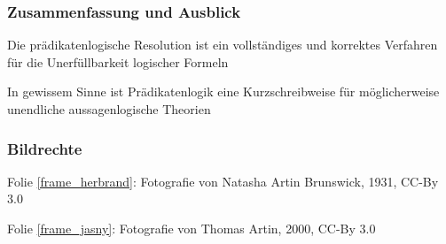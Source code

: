 \documentclass[aspectratio=1610,onlymath]{beamer}
\begin{document}
\begin{frame}\frametitle{Zusammenfassung und Ausblick}

Die prädikatenlogische Resolution ist ein vollständiges und korrektes Verfahren für die Unerfüllbarkeit logischer Formeln\bigskip

In gewissem Sinne ist Prädikatenlogik eine Kurzschreibweise für möglicherweise unendliche aussagenlogische Theorien
\bigskip




\end{frame}


\begin{frame}[t]\frametitle{Bildrechte}

Folie \ref{frame_herbrand}: Fotografie von Natasha Artin Brunswick, 1931, CC-By 3.0

Folie \ref{frame_jasny}: Fotografie von Thomas Artin, 2000, CC-By 3.0

\end{frame}
\end{document}
